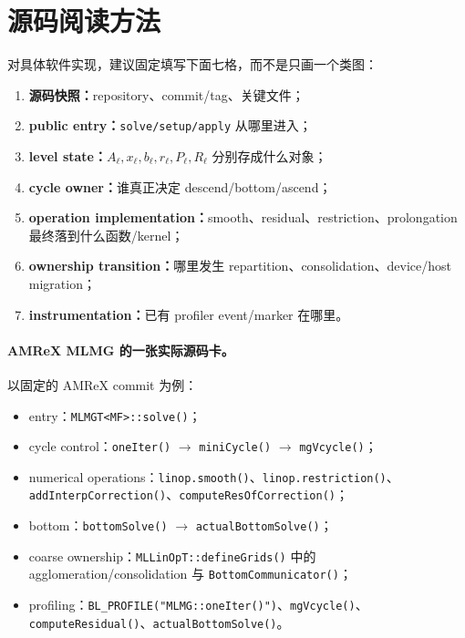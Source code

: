 \section{源码阅读方法}

对具体软件实现，建议固定填写下面七格，而不是只画一个类图：

\begin{enumerate}
\item \textbf{源码快照：}repository、commit/tag、关键文件；
\item \textbf{public entry：}\texttt{solve/setup/apply} 从哪里进入；
\item \textbf{level state：}$A_\ell,x_\ell,b_\ell,r_\ell,P_\ell,R_\ell$ 分别存成什么对象；
\item \textbf{cycle owner：}谁真正决定 descend/bottom/ascend；
\item \textbf{operation implementation：}smooth、residual、restriction、prolongation 最终落到什么函数/kernel；
\item \textbf{ownership transition：}哪里发生 repartition、consolidation、device/host migration；
\item \textbf{instrumentation：}已有 profiler event/marker 在哪里。
\end{enumerate}

\paragraph{AMReX MLMG 的一张实际源码卡。}
以固定的 AMReX commit 为例：

\begin{itemize}
\item entry：\texttt{MLMGT<MF>::solve()}；
\item cycle control：\texttt{oneIter()} $\rightarrow$ \texttt{miniCycle()} $\rightarrow$ \texttt{mgVcycle()}；
\item numerical operations：\texttt{linop.smooth()}、\texttt{linop.restriction()}、\texttt{addInterpCorrection()}、\texttt{computeResOfCorrection()}；
\item bottom：\texttt{bottomSolve()} $\rightarrow$ \texttt{actualBottomSolve()}；
\item coarse ownership：\texttt{MLLinOpT::defineGrids()} 中的 agglomeration/consolidation 与 \texttt{BottomCommunicator()}；
\item profiling：\texttt{BL\_PROFILE("MLMG::oneIter()")}、\texttt{mgVcycle()}、\texttt{computeResidual()}、\texttt{actualBottomSolve()}。
\end{itemize}

